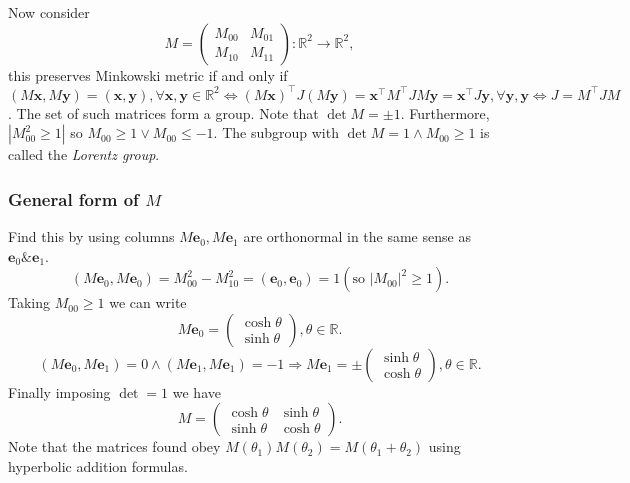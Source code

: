 \documentclass[a4paper]{article}
\begin{document}
    Now consider
    \[
      M=
      \begin{pmatrix}
        M_{00}&M_{01}\\
        M_{10}&M_{11}
      \end{pmatrix}: \mathbb{R}^{2}\to \mathbb{R}^{2},
    \]
    this preserves Minkowski metric if and only if $ (M\mathbf{x},
    M\mathbf{y})=(\mathbf{x},\mathbf{y}),\forall
    \mathbf{x},\mathbf{y}\in \mathbb{R}^{2} \Leftrightarrow
    (M\mathbf{x})^{\top }J(M\mathbf{y})=\mathbf{x}^\top M^\top
    JM\mathbf{y} = \mathbf{x}^\top J \mathbf{y},\forall
    \mathbf{y},\mathbf{y} \Leftrightarrow J=M^\top JM $. The set of
    such matrices form a group. Note that $ \det M=\pm 1 $.
    Furthermore, $ |M_{00}^2\ge 1| $ so $ M_{00}\ge 1 \lor M_{00}\le
    -1 $. The subgroup with $ \det M=1 \land M_{00}\ge 1 $ is called
    the \textit{Lorentz group}.
    \subsubsection*{General form of $M$}
    Find this by using columns $ M\mathbf{e}_0,M\mathbf{e}_1 $ are
    orthonormal in the same sense as $ \mathbf{e}_0\&\mathbf{e}_1 $.
    \[
      (M\mathbf{e}_0,M\mathbf{e}_0)=M_{00}^2-M_{10}^2=(\mathbf{e}_0,\mathbf{e}_0)=1(\text{so
      } |M_{00}|^2\ge 1).
    \]
    Taking $ M_{00}\ge 1 $ we can write
    \[
      M\mathbf{e}_0=
      \begin{pmatrix}
        \cosh \theta\\ \sinh \theta
      \end{pmatrix},\theta\in \mathbb{R}.
    \]
    \[
      (M\mathbf{e}_0,M\mathbf{e}_1)=0 \land
      (M\mathbf{e}_1,M\mathbf{e}_1)=-1 \Longrightarrow M\mathbf{e}_1 = \pm
      \begin{pmatrix}
        \sinh \theta\\ \cosh \theta
      \end{pmatrix},\theta\in \mathbb{R}.
    \]
    Finally imposing $\det=1$ we have
    \[
      M=
      \begin{pmatrix}
        \cosh \theta & \sinh \theta\\
        \sinh \theta & \cosh \theta
      \end{pmatrix}.
    \]
    Note that the matrices found obey $
    M(\theta_1)M(\theta_2)=M(\theta_1+\theta_2) $ using hyperbolic
    addition formulas.
\end{document}
